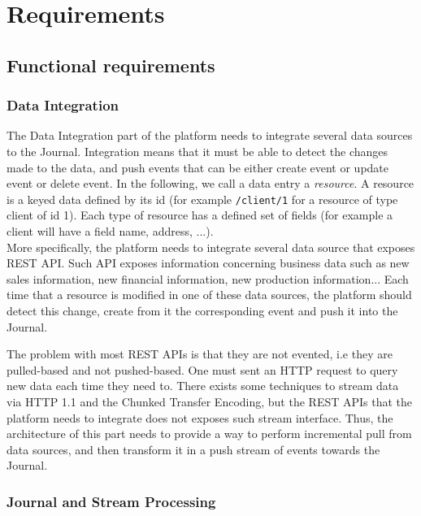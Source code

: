 \chapter{Requirements}

\section{Functional requirements}

\subsection{Data Integration}

The Data Integration part of the platform needs to integrate several data sources to the Journal. Integration means that it must be able 
to detect the changes made to the data, and push events that can be either create event or update event or delete event.
In the following, we call a data entry a \textit{resource}. A resource is a keyed data defined by its id (for example \verb|/client/1| for a
resource of type client of id 1). Each type of resource has a defined set of fields (for example a client
will have a field name, address, ...).
\\

More specifically, the platform needs to integrate several data source that exposes REST API. Such API exposes information
concerning business data such as new sales information, new financial information, new production information...
Each time that a resource is modified in one of these data sources, the platform should detect this change, create from it
the corresponding event and push it into the Journal.

The problem with most REST APIs is that they are not evented, i.e they are pulled-based and not pushed-based. 
One must sent an HTTP request to query new data each time they need to. There exists some techniques to stream data via HTTP 1.1 and the 
Chunked Transfer Encoding, but the REST APIs that the platform needs to integrate does not exposes such stream interface. 
Thus, the architecture of this part needs to provide a way to perform incremental pull from data sources, and then transform
it in a push stream of events towards the Journal.


\subsection{Journal and Stream Processing}

